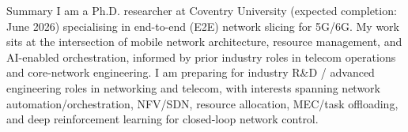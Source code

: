 \documentclass{resume}
\begin{document}
 \vspace{-5mm}

\begin{rSection}{Summary}
I am a Ph.D. researcher at Coventry University (expected completion: June 2026) specialising in end-to-end (E2E) network slicing for 5G/6G. My work sits at the intersection of mobile network architecture, resource management, and AI-enabled orchestration, informed by prior industry roles in telecom operations and core-network engineering. I am preparing for industry R\&D / advanced engineering roles in networking and telecom, with interests spanning network automation/orchestration, NFV/SDN, resource allocation, MEC/task offloading, and deep reinforcement learning for closed-loop network control.
\end{rSection}
\end{document}
